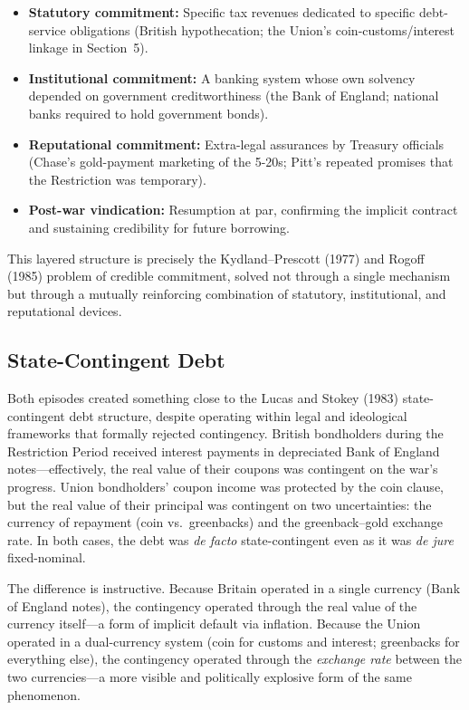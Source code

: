 \documentclass[12pt]{article}
\begin{document}
\begin{itemize}
\item \textbf{Statutory commitment:} Specific tax revenues dedicated to
  specific debt-service obligations (British hypothecation; the Union's
  coin-customs/interest linkage in Section~5).
\item \textbf{Institutional commitment:} A banking system whose own
  solvency depended on government creditworthiness (the Bank of England;
  national banks required to hold government bonds).
\item \textbf{Reputational commitment:} Extra-legal assurances by
  Treasury officials (Chase's gold-payment marketing of the 5-20s;
  Pitt's repeated promises that the Restriction was temporary).
\item \textbf{Post-war vindication:} Resumption at par, confirming the
  implicit contract and sustaining credibility for future borrowing.
\end{itemize}

This layered structure is precisely the Kydland--Prescott (1977) and
Rogoff (1985) problem of credible commitment, solved not through a
single mechanism but through a mutually reinforcing combination of
statutory, institutional, and reputational devices.

\subsection{State-Contingent Debt}

Both episodes created something close to the Lucas and Stokey (1983)
state-contingent debt structure, despite operating within legal and
ideological frameworks that formally rejected contingency. British
bondholders during the Restriction Period received interest payments in
depreciated Bank of England notes---effectively, the real value of their
coupons was contingent on the war's progress. Union bondholders' coupon
income was protected by the coin clause, but the real value of their
principal was contingent on two uncertainties: the currency of repayment
(coin vs.\ greenbacks) and the greenback--gold exchange rate. In both
cases, the debt was \textit{de facto} state-contingent even as it was
\textit{de jure} fixed-nominal.

The difference is instructive. Because Britain operated in a single
currency (Bank of England notes), the contingency operated through the
real value of the currency itself---a form of implicit default via
inflation. Because the Union operated in a dual-currency system (coin
for customs and interest; greenbacks for everything else), the
contingency operated through the \textit{exchange rate} between the two
currencies---a more visible and politically explosive form of the same
phenomenon.
\end{document}

